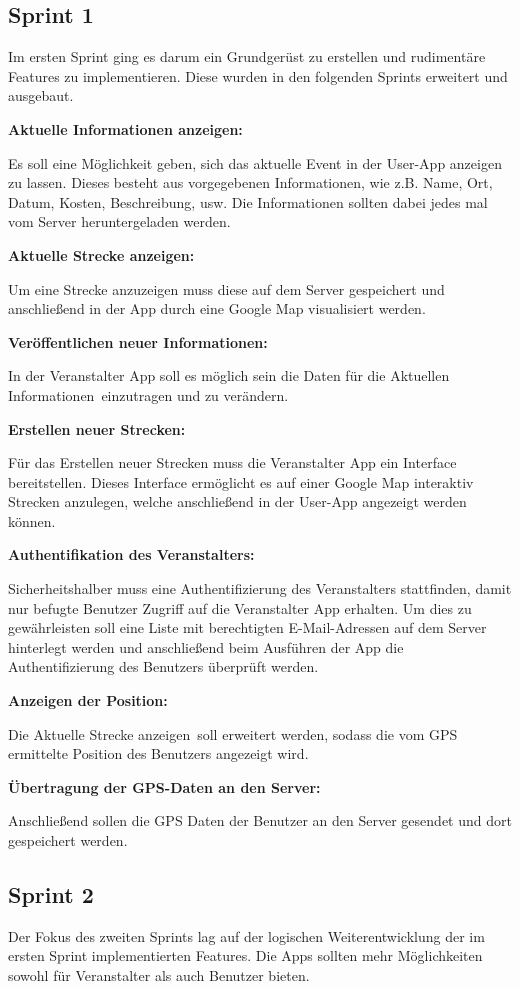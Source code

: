 \documentclass[a4paper, titlepage]{scrartcl}
\begin{document}
\subsection{Sprint 1}
Im ersten Sprint ging es darum ein Grundgerüst zu erstellen und rudimentäre Features zu implementieren. Diese wurden in den folgenden Sprints erweitert und ausgebaut.

\textbf{Aktuelle Informationen anzeigen:}

Es soll eine Möglichkeit geben, sich das aktuelle Event in der User-App anzeigen zu lassen. Dieses besteht aus vorgegebenen Informationen, wie z.B. Name, Ort, Datum, Kosten, Beschreibung, usw. Die Informationen sollten dabei jedes mal vom Server heruntergeladen werden.

\textbf{Aktuelle Strecke anzeigen:}

Um eine Strecke anzuzeigen muss diese auf dem Server gespeichert und anschließend in der App durch eine Google Map visualisiert werden.

\textbf{Veröffentlichen neuer Informationen:}

In der Veranstalter App soll es möglich sein die Daten für die \glqq Aktuellen Informationen\grqq\ einzutragen und zu verändern.

\textbf{Erstellen neuer Strecken:}

Für das Erstellen neuer Strecken muss die Veranstalter App ein Interface bereitstellen. Dieses Interface ermöglicht es auf einer Google Map interaktiv Strecken anzulegen, welche anschließend in der User-App angezeigt werden können.

\textbf{Authentifikation des Veranstalters:}

Sicherheitshalber muss eine Authentifizierung des Veranstalters stattfinden, damit nur befugte Benutzer Zugriff auf die Veranstalter App erhalten. Um dies zu gewährleisten soll eine Liste mit berechtigten E-Mail-Adressen auf dem Server hinterlegt werden und anschließend beim Ausführen der App die Authentifizierung des Benutzers überprüft werden.

\textbf{Anzeigen der Position:}

Die \glqq Aktuelle Strecke anzeigen\grqq\ soll erweitert werden, sodass die vom GPS ermittelte Position des Benutzers angezeigt wird.

\textbf{Übertragung der GPS-Daten an den Server:}

Anschließend sollen die GPS Daten der Benutzer an den Server gesendet und dort gespeichert werden.

\subsection{Sprint 2}
Der Fokus des zweiten Sprints lag auf der logischen Weiterentwicklung der im ersten Sprint implementierten Features. Die Apps sollten mehr Möglichkeiten sowohl für Veranstalter als auch Benutzer bieten.
\end{document}
